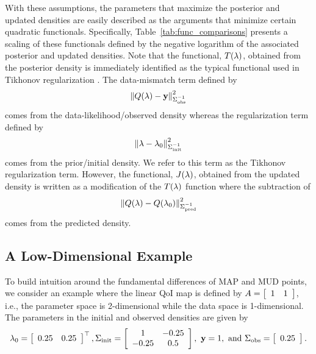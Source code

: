 With these assumptions, the parameters that maximize the posterior and updated densities are easily described as the arguments that minimize certain quadratic functionals.
Specifically, Table~\ref{tab:func_comparisons} presents a scaling of these functionals defined by the negative logarithm of the associated posterior and updated densities.
Note that the functional, $T(\param)$, obtained from the posterior density is immediately identified as the typical functional used in Tikhonov regularization \citep{Tarantola_book}.
The data-mismatch term defined by
\begin{equation*}
	\norm{Q(\param)-\observedMean}_{\observedCov^{-1}}^2
\end{equation*}
comes from the data-likelihood/observed density whereas the regularization term defined by
\begin{equation*}
	 \norm{\param-\initialMean}_{\initialCov^{-1}}^2
\end{equation*}
comes from the prior/initial density.
We refer to this term as the Tikhonov regularization term.
However, the functional, $J(\param)$, obtained from the updated density is written as a modification of the $T(\param)$ function where the subtraction of
\begin{equation*}
	 \norm{Q(\param)-Q(\initialMean)}_{\predictedCov^{-1}}^2
\end{equation*}
comes from the predicted density.
\vfill

\subsection{A Low-Dimensional Example}\label{subsec:low-d-example}
To build intuition around the fundamental differences of MAP and MUD points, we consider an example where the linear QoI map is defined by $A=\mat{cc}{1 & 1}$, i.e., the parameter space is 2-dimensional while the data space is 1-dimensional.
The parameters in the initial and observed densities are given by
\[
	\initialMean = \mat{cc}{0.25 & 0.25}^\top, \initialCov = \mat{cc}{1 & -0.25 \\ -0.25 & 0.5}, \ \observedMean=1, \text{ and } \observedCov = \mat{c}{0.25}.
\]

